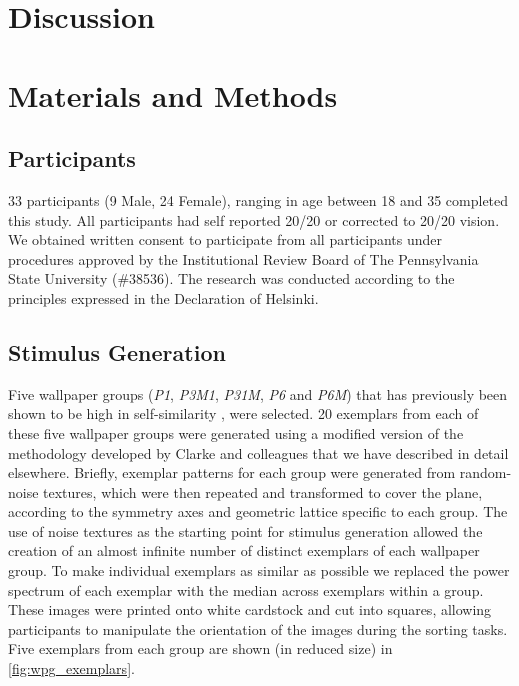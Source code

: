 \documentclass[11pt, twoside]{article}
\begin{document}
\section*{Discussion}

\section*{Materials and Methods}
\label{methods}

\subsection*{Participants}
33 participants (9 Male, 24 Female), ranging in age between 18 and 35 completed this study. All participants had self reported 20/20 or corrected to 20/20 vision. We obtained written consent to participate from all participants under procedures approved by the Institutional Review Board of The Pennsylvania State University (\#38536). The research was conducted according to the principles expressed in the Declaration of Helsinki.

\subsection*{Stimulus Generation}
Five wallpaper groups (\textit{P1}, \textit{P3M1}, \textit{P31M}, \textit{P6} and \textit{P6M}) that has previously been shown to be high in self-similarity \citep{RN172}, were selected. 20 exemplars from each of these five wallpaper groups were generated using a modified version of the methodology developed by Clarke and colleagues\citep{RN172} that we have described in detail elsewhere\citep{RN1725}. Briefly, exemplar patterns for each group were generated from random-noise textures, which were then repeated and transformed to cover the plane, according to the symmetry axes and geometric lattice specific to each group. The use of noise textures as the starting point for stimulus generation allowed the creation of an almost infinite number of distinct exemplars of each wallpaper group. To make individual exemplars as similar as possible we replaced the power spectrum of each exemplar with the median across exemplars within a group. These images were printed onto white cardstock and cut into squares, allowing participants to manipulate the orientation of the images during the sorting tasks. Five exemplars from each group are shown (in reduced size) in \ref{fig:wpg_exemplars}. 
\end{document}
